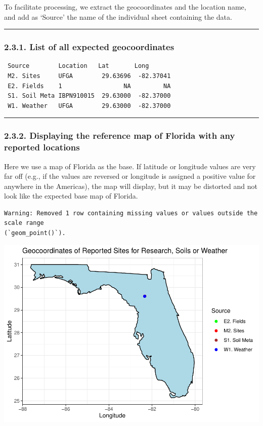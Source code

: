 \documentclass[
]{article}
\begin{document}
To facilitate processing, we extract the geocoordinates and the location
name, and add as `Source' the name of the individual sheet containing
the data.

\begin{center}\rule{0.5\linewidth}{0.5pt}\end{center}

\subsubsection{2.3.1. List of all expected
geocoordinates}\label{list-of-all-expected-geocoordinates}

\begin{verbatim}
 Source        Location   Lat       Long      
 M2. Sites     UFGA        29.63696  -82.37041
 E2. Fields    1                 NA         NA
 S1. Soil Meta IBPN910015  29.63000  -82.37000
 W1. Weather   UFGA        29.63000  -82.37000
\end{verbatim}

\begin{center}\rule{0.5\linewidth}{0.5pt}\end{center}

\subsubsection{2.3.2. Displaying the reference map of Florida with any
reported
locations}\label{displaying-the-reference-map-of-florida-with-any-reported-locations}

Here we use a map of Florida as the base. If latitude or longitude
values are very far off (e.g., if the values are reversed or longitude
is assigned a positive value for anywhere in the Americas), the map will
display, but it may be distorted and not look like the expected base map
of Florida.

\begin{verbatim}
Warning: Removed 1 row containing missing values or values outside the scale range
(`geom_point()`).
\end{verbatim}

\includegraphics{FL_Crop_BMP_QA_single_dataset_files/figure-latex/map-geocoords-1.pdf}
\end{document}
